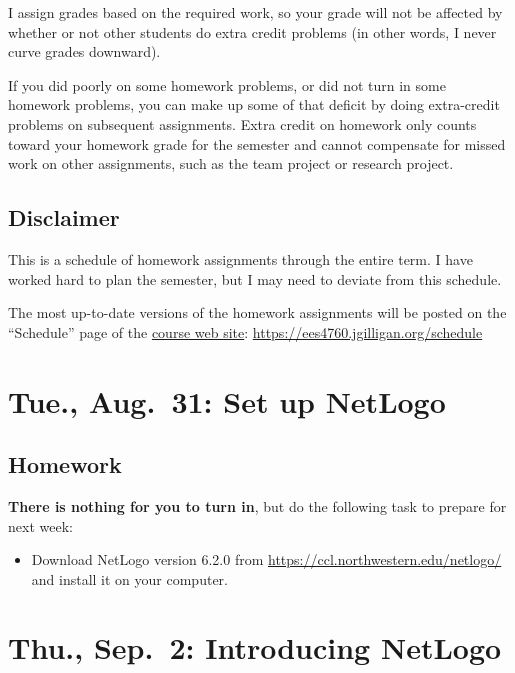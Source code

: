 \documentclass[
]{article}
\providecommand{\tightlist}{%
  \setlength{\itemsep}{0pt}\setlength{\parskip}{0pt}}
\begin{document}
I assign grades based on the required work, so your grade will not be
affected by whether or not other students do extra credit problems (in
other words, I never curve grades downward).

If you did poorly on some homework problems, or did not turn in some
homework problems, you can make up some of that deficit by doing
extra-credit problems on subsequent assignments. Extra credit on
homework only counts toward your homework grade for the semester and
cannot compensate for missed work on other assignments, such as the team
project or research project.

\hypertarget{disclaimer}{%
\subsection{Disclaimer}\label{disclaimer}}

This is a schedule of homework assignments through the entire term. I
have worked hard to plan the semester, but I may need to deviate from
this schedule.

The most up-to-date versions of the homework assignments will be posted
on the ``Schedule'' page of the
\href{https://ees4760.jgilligan.org/schedule}{course web site}:
\url{https://ees4760.jgilligan.org/schedule}

\hypertarget{tue.-aug.-31-set-up-netlogo}{%
\section{Tue., Aug.~31: Set up
NetLogo}\label{tue.-aug.-31-set-up-netlogo}}

\hypertarget{homework}{%
\subsection{Homework}\label{homework}}

\textbf{There is nothing for you to turn in}, but do the following task
to prepare for next week:

\begin{itemize}
\tightlist
\item
  Download NetLogo version 6.2.0 from
  \url{https://ccl.northwestern.edu/netlogo/} and install it on your
  computer.
\end{itemize}

\hypertarget{thu.-sep.-2-introducing-netlogo}{%
\section{Thu., Sep.~2: Introducing
NetLogo}\label{thu.-sep.-2-introducing-netlogo}}
\end{document}
